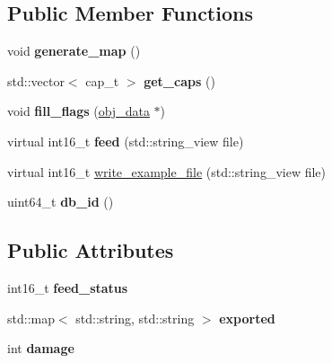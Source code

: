 \subsection*{Public Member Functions}
\begin{DoxyCompactItemize}
\item 
\mbox{\label{structmods_1_1yaml_1_1drone__description__t_a48de3ba164c26d2045f676687a0e4a11}} 
void {\bfseries generate\+\_\+map} ()
\item 
\mbox{\label{structmods_1_1yaml_1_1drone__description__t_ad4a7274a929798ec5cae147b064ea797}} 
std\+::vector$<$ cap\+\_\+t $>$ {\bfseries get\+\_\+caps} ()
\item 
\mbox{\label{structmods_1_1yaml_1_1drone__description__t_a72834aca3c774dafb80af230880377be}} 
void {\bfseries fill\+\_\+flags} (\hyperlink{structobj__data}{obj\+\_\+data} $\ast$)
\item 
\mbox{\label{structmods_1_1yaml_1_1drone__description__t_a09f8b9e411a23935735fb4a4e75652e9}} 
virtual int16\+\_\+t {\bfseries feed} (std\+::string\+\_\+view file)
\item 
virtual int16\+\_\+t \hyperlink{structmods_1_1yaml_1_1drone__description__t_a5ae795e47e4760c81d87143b615cfb84}{write\+\_\+example\+\_\+file} (std\+::string\+\_\+view file)
\item 
\mbox{\label{structmods_1_1yaml_1_1drone__description__t_a8610ca63e2cb920a669d974be7a4f83d}} 
uint64\+\_\+t {\bfseries db\+\_\+id} ()
\end{DoxyCompactItemize}
\subsection*{Public Attributes}
\begin{DoxyCompactItemize}
\item 
\mbox{\label{structmods_1_1yaml_1_1drone__description__t_a9fc266e3c3b64b2000f8ac9a60e849a8}} 
int16\+\_\+t {\bfseries feed\+\_\+status}
\item 
\mbox{\label{structmods_1_1yaml_1_1drone__description__t_a4629c77a86706aed9982a3892f0a73aa}} 
std\+::map$<$ std\+::string, std\+::string $>$ {\bfseries exported}
\item 
\mbox{\label{structmods_1_1yaml_1_1drone__description__t_aabcfe724ad455a8ab30ad70b503e5ce7}} 
int {\bfseries damage}
\end{DoxyCompactItemize}


